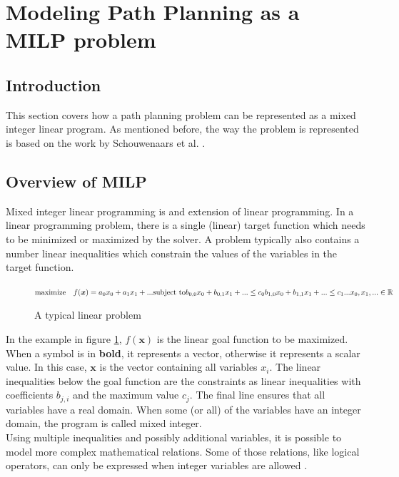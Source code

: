 

\section{Modeling Path Planning as a MILP problem}
\subsection{Introduction}
This section covers how a path planning problem can be represented as a mixed integer linear program. As mentioned before, the way the problem is represented is based on the work by Schouwenaars et al. \cite{Schouwenaars2001}.
\subsection{Overview of MILP}
\label{subsec:previous}
Mixed integer linear programming is and extension of linear programming. In a linear programming problem, there is a single (linear) target function which needs to be minimized or maximized by the solver. A problem typically also contains a number linear inequalities which constrain the values of the variables in the target function. \\
\begin{figure}
\begin{math}
\text{maximize} \quad f(\boldsymbol{x}) = a_0 x_0 + a_1 x_1 + ...\\
\text{subject to} \\
b_{0,0} x_0 + b_{0,1} x_1 + ...\leq c_0 \\
b_{1,0} x_0 + b_{1,1} x_1 + ...\leq c_1 \\
... \\
x_0, x_1, ... \in \mathbb{R}
\end{math}
\caption{A typical linear problem}
\label{fig:example-lp}
\end{figure}
In the example in figure \ref{fig:example-lp}, $  f(\boldsymbol{x}) $ is the linear goal function to be maximized. When a symbol is in \textbf{bold}, it represents a vector, otherwise it represents a scalar value. In this case, $\boldsymbol{x}$ is the vector containing all variables $x_i$. The linear inequalities below the goal function are the constraints as linear inequalities with coefficients $b_{j,i}$ and the maximum value $c_j$. The final line ensures that all variables have a real domain. When some (or all) of the variables have an integer domain, the program is called mixed integer. \\
Using multiple inequalities and possibly additional variables, it is possible to model more complex mathematical relations. Some of those relations, like logical operators, can only be expressed when integer variables are allowed \cite{Mitra1994}. 
